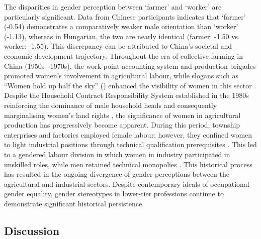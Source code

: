 \documentclass[11pt]{article}
\newcommand{\zh}[1]{\simplifiedchinesefont{#1}\rmfamily}
\begin{document}

The disparities in gender perception between `farmer' and `worker' are particularly significant. Data from Chinese participants indicates that `farmer' (-0.54) demonstrates a comparatively weaker male orientation than `worker' (-1.13), whereas in Hungarian, the two are nearly identical (farmer: -1.50 vs. worker: -1.55). This discrepancy can be attributed to China’s societal and economic development trajectory. Throughout the era of collective farming in China (1950s–-1970s), the work-point accounting system and production brigades promoted women's involvement in agricultural labour, while slogans such as ``Women hold up half the sky'' (\zh{妇女能顶半边天}) enhanced the visibility of women in this sector \citep{jacka_1997_agriculture,jacka_1997_domestic}. Despite the Household Contract Responsibility System established in the 1980s reinforcing the dominance of male household heads and consequently marginalising women's land rights \citep{zhu_2009_gender}, the significance of women in agricultural production has progressively become apparent. During this period, township enterprises and factories employed female labour; however, they confined women to light industrial positions through technical qualification prerequisites \citep{liu_2007_gender}. This led to a gendered labour division in which women in industry participated in unskilled roles, while men retained technical monopolies \citep{bossen_2002_chinese}. This historical process has resulted in the ongoing divergence of gender perceptions between the agricultural and industrial sectors. Despite contemporary ideals of occupational gender equality, gender stereotypes in lower-tier professions continue to demonstrate significant historical persistence.




\subsection{Discussion}\label{sec:discussion}
\end{document}
